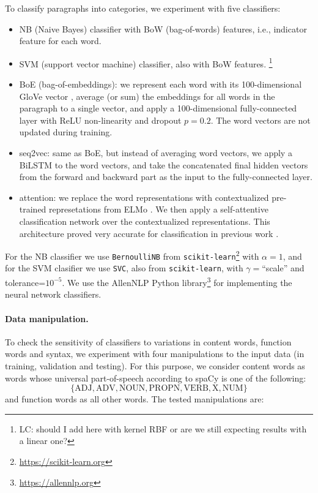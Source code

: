 \documentclass[11pt,a4paper,table]{article}
\newcommand{\lc}[1]{\footnote{\color{blue}LC: #1}}
\begin{document}
To classify paragraphs into categories, we experiment with five classifiers:

\begin{itemize}
  \item NB (Naive Bayes) classifier
  with BoW (bag-of-words) features, i.e., indicator feature for each word.
  \item SVM (support vector machine) classifier,
  also with BoW features.  \lc{should I add here with kernel RBF or are we still expecting results with a linear one?}
  \item BoE (bag-of-embeddings): we represent each word with its 100-dimensional
  GloVe vector \cite{pennington2014glove}, average (or sum) the embeddings for all words in the paragraph
  to a single vector, and apply a 100-dimensional fully-connected layer with
  ReLU non-linearity and dropout $p=0.2$.
  The word vectors are not updated during training.
  \item seq2vec: same as BoE, but instead of averaging word vectors,
  we apply a BiLSTM to the word vectors, and take the concatenated
  final hidden vectors from the forward and backward part as the input to the
  fully-connected layer.
  \item attention: we replace the word representations with contextualized
  pre-trained represetations from ELMo \cite{Peters:2018}. We then apply a self-attentive
  classification network \cite{mccann2017learned} over the contextualized representations. This architecture proved very accurate for classification in
  previous work \cite{W18-5427,D18-1401}.
\end{itemize}

For the NB classifier we use \texttt{BernoulliNB} from
\texttt{scikit-learn}\footnote{\url{https://scikit-learn.org}}
with $\alpha=1$,
and for the SVM clasifier we use \texttt{SVC}, also from \texttt{scikit-learn},
with $\gamma=$``scale'' and tolerance=$10^{-5}$.
We use the AllenNLP Python library\footnote{\url{https://allennlp.org}}
\cite{Gardner2017AllenNLP} for implementing the neural network classifiers.

\paragraph{Data manipulation.}

To check the sensitivity of classifiers to variations in content words,
function words and syntax, we experiment with four manipulations to the input
data (in training, validation and testing).
For this purpose, we consider content words as words whose universal part-of-speech
according to spaCy is one of the following:
\[\{\mathrm{ADJ, ADV, NOUN, PROPN, VERB, X, NUM}\}\]
and function words as all other words.
The tested manipulations are:
\end{document}
